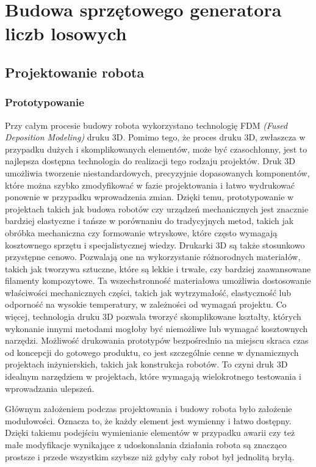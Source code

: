 
\chapter{Budowa sprzętowego generatora liczb losowych}
\section{Projektowanie robota}
\subsection{Prototypowanie}

Przy całym procesie budowy robota wykorzystano technologię FDM \textit{(Fused Deposition Modeling)} druku 3D. Pomimo tego, że proces druku 3D, zwłaszcza w przypadku dużych i skomplikowanych elementów, może być czasochłonny, jest to najlepsza dostępna
technologia do realizacji tego rodzaju projektów. Druk 3D umożliwia tworzenie niestandardowych, precyzyjnie dopasowanych komponentów, które można 
szybko zmodyfikować w fazie projektowania i łatwo wydrukować ponownie w przypadku wprowadzenia zmian. Dzięki temu, prototypowanie w projektach takich 
jak budowa robotów czy urządzeń mechanicznych jest znacznie bardziej elastyczne i tańsze w porównaniu do tradycyjnych metod, takich jak obróbka 
mechaniczna czy formowanie wtryskowe, które często wymagają kosztownego sprzętu i specjalistycznej wiedzy.
Drukarki 3D są także stosunkowo przystępne cenowo. Pozwalają one na wykorzystanie różnorodnych materiałów, takich jak tworzywa sztuczne, które są lekkie 
i trwałe, czy bardziej zaawansowane filamenty kompozytowe. Ta wszechstronność materiałowa umożliwia dostosowanie właściwości mechanicznych części, takich 
jak wytrzymałość, elastyczność lub odporność na wysokie temperatury, w zależności od wymagań projektu.
Co więcej, technologia druku 3D pozwala tworzyć skomplikowane kształty, których wykonanie innymi metodami mogłoby być niemożliwe lub wymagać kosztownych 
narzędzi. Możliwość drukowania prototypów bezpośrednio na miejscu skraca czas od koncepcji do gotowego produktu, co jest szczególnie cenne w dynamicznych 
projektach inżynierskich, takich jak konstrukcja robotów. To czyni druk 3D idealnym narzędziem w projektach, które wymagają wielokrotnego 
testowania i wprowadzania ulepszeń.

Głównym założeniem podczas projektowania i budowy robota było założenie modułowości. Oznacza to, że każdy element jest wymienny i łatwo dostępny.
Dzięki takiemu podejściu wymienianie elementów w przypadku awarii czy też małe modyfikacje wynikające z udoskonalania działania robota
są znacząco prostsze i przede wszystkim szybsze niż gdyby cały robot był jednolitą bryłą.

